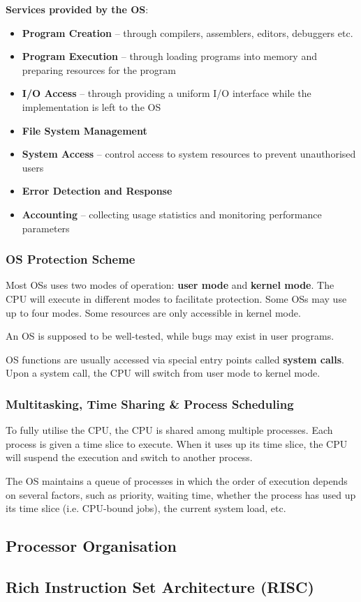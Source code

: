 \textbf{Services provided by the OS}:
\begin{itemize}
    \item \textbf{Program Creation} -- through compilers, assemblers, editors, debuggers etc.
    \item \textbf{Program Execution} -- through loading programs into memory and preparing resources for the program
    \item \textbf{I/O Access} -- through providing a uniform I/O interface while the implementation is left to the OS
    \item \textbf{File System Management}
    \item \textbf{System Access} -- control access to system resources to prevent unauthorised users
    \item \textbf{Error Detection and Response}
    \item \textbf{Accounting} -- collecting usage statistics and monitoring performance parameters
\end{itemize}

\subsubsection{OS Protection Scheme}

Most OSs uses two modes of operation: \textbf{user mode} and \textbf{kernel mode}.
The CPU will execute in different modes to facilitate protection. Some OSs may use up
to four modes. Some resources are only accessible in kernel mode.

An OS is supposed to be well-tested, while bugs may exist in user programs.

OS functions are usually accessed via special entry points called \textbf{system calls}.
Upon a system call, the CPU will switch from user mode to kernel mode.

\subsubsection{Multitasking, Time Sharing \& Process Scheduling}

To fully utilise the CPU, the CPU is shared among multiple processes. Each process
is given a time slice to execute. When it uses up its time slice, the CPU will
suspend the execution and switch to another process.

The OS maintains a queue of processes in which the order of execution depends on
several factors, such as priority, waiting time, whether the process has used up
its time slice (i.e. CPU-bound jobs), the current system load, etc.

\subsection{Processor Organisation}

\subsection{Rich Instruction Set Architecture (RISC)}